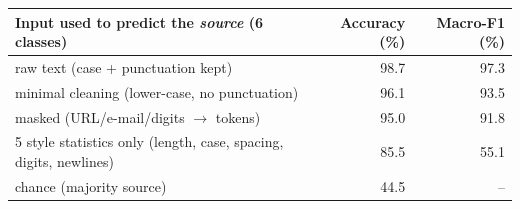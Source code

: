 \begin{tabular}{lrr}
\toprule
Input used to predict the \emph{source} (6 classes) & Accuracy (\%) & Macro-F1 (\%) \\
\midrule
raw text (case + punctuation kept) & 98.7 & 97.3 \\
minimal cleaning (lower-case, no punctuation) & 96.1 & 93.5 \\
masked (URL/e-mail/digits $\rightarrow$ tokens) & 95.0 & 91.8 \\
5 style statistics only (length, case, spacing, digits, newlines) & 85.5 & 55.1 \\
chance (majority source) & 44.5 & -- \\
\bottomrule
\end{tabular}